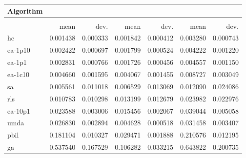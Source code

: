 \begin{tabular}{@{} l *{6}{>{{}}N{1}{2}} @{}}
\toprule
{Algorithm} &  \\
\midrule
&  &  &  \\
\midrule
& {mean} & {dev.} & {mean} & {dev.} & {mean} & {dev.} \\
\midrule
hc & 0.001438 & 0.000333 & 0.001842 & 0.000412 & 0.003280 & 0.000743 \\
ea-1p10 & 0.002422 & 0.000697 & 0.001799 & 0.000524 & 0.004222 & 0.001220 \\
ea-1p1 & 0.002831 & 0.000766 & 0.001726 & 0.000456 & 0.004557 & 0.001150 \\
ea-1c10 & 0.004660 & 0.001595 & 0.004067 & 0.001455 & 0.008727 & 0.003049 \\
sa & 0.005561 & 0.011018 & 0.006529 & 0.013069 & 0.012090 & 0.024086 \\
rls & 0.010783 & 0.010298 & 0.013199 & 0.012679 & 0.023982 & 0.022976 \\
ea-10p1 & 0.023588 & 0.003006 & 0.015456 & 0.002067 & 0.039044 & 0.005058 \\
umda & 0.026830 & 0.002894 & 0.004628 & 0.000518 & 0.031458 & 0.003407 \\
pbil & 0.181104 & 0.010327 & 0.029471 & 0.001888 & 0.210576 & 0.012195 \\
ga & 0.537540 & 0.167529 & 0.106282 & 0.033215 & 0.643822 & 0.200735 \\
\bottomrule
\end{tabular}
